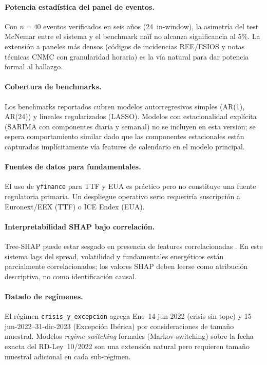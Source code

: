 \documentclass[11pt,a4paper]{article}
\begin{document}
\paragraph{Potencia estadística del panel de eventos.} Con $n = 40$
eventos verificados en seis años (24~in-window), la asimetría del test
McNemar entre el sistema y el benchmark naïf no alcanza significancia
al 5\%. La extensión a paneles más densos (códigos de incidencias
REE/ESIOS y notas técnicas CNMC con granularidad horaria) es la vía
natural para dar potencia formal al hallazgo.

\paragraph{Cobertura de benchmarks.} Los benchmarks reportados cubren
modelos autorregresivos simples (AR(1), AR(24)) y lineales regularizados
(LASSO). Modelos con estacionalidad explícita (SARIMA con componentes
diaria y semanal) no se incluyen en esta versión; se espera
comportamiento similar dado que las componentes estacionales están
capturadas implícitamente vía features de calendario en el modelo
principal.

\paragraph{Fuentes de datos para fundamentales.} El uso de
\texttt{yfinance} para TTF y EUA es práctico pero no constituye una
fuente regulatoria primaria. Un despliegue operativo serio requeriría
suscripción a Euronext/EEX (TTF) o ICE Endex (EUA).

\paragraph{Interpretabilidad SHAP bajo correlación.} Tree-SHAP puede
estar sesgado en presencia de features correlacionadas
\citep{Lago2021}. En este sistema lags del spread, volatilidad y
fundamentales energéticos están parcialmente correlacionados; los
valores SHAP deben leerse como atribución descriptiva, no como
identificación causal.

\paragraph{Datado de regímenes.} El régimen \texttt{crisis\_y\_excepcion}
agrega Ene--14-jun-2022 (crisis sin tope) y 15-jun-2022--31-dic-2023
(Excepción Ibérica) por consideraciones de tamaño muestral. Modelos
\emph{regime-switching} formales (Markov-switching) sobre la fecha
exacta del RD-Ley~10/2022 son una extensión natural pero requieren
tamaño muestral adicional en cada sub-régimen.
\end{document}
